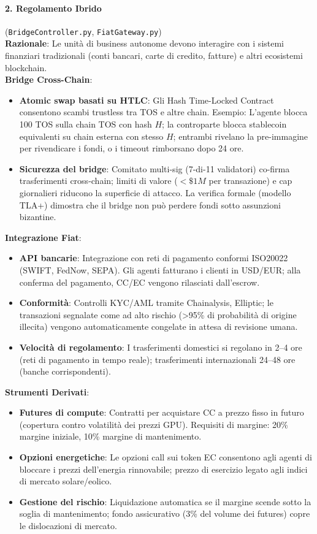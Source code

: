 \documentclass[11pt]{article}
\begin{document}
\paragraph{2. Regolamento Ibrido} (\texttt{BridgeController.py}, \texttt{FiatGateway.py})\\
\textbf{Razionale}: Le unità di business autonome devono interagire con i sistemi finanziari tradizionali (conti bancari, carte di credito, fatture) e altri ecosistemi blockchain.\\
\textbf{Bridge Cross-Chain}:
\begin{itemize}[noitemsep]
  \item \textbf{Atomic swap basati su HTLC}: Gli Hash Time-Locked Contract consentono scambi trustless tra TOS e altre chain. Esempio: L'agente blocca 100 TOS sulla chain TOS con hash $H$; la controparte blocca stablecoin equivalenti su chain esterna con stesso $H$; entrambi rivelano la pre-immagine per rivendicare i fondi, o i timeout rimborsano dopo 24 ore.
  \item \textbf{Sicurezza del bridge}: Comitato multi-sig (7-di-11 validatori) co-firma trasferimenti cross-chain; limiti di valore ($<\$1M$ per transazione) e cap giornalieri riducono la superficie di attacco. La verifica formale (modello TLA+) dimostra che il bridge non può perdere fondi sotto assunzioni bizantine.
\end{itemize}
\textbf{Integrazione Fiat}:
\begin{itemize}[noitemsep]
  \item \textbf{API bancarie}: Integrazione con reti di pagamento conformi ISO20022 (SWIFT, FedNow, SEPA). Gli agenti fatturano i clienti in USD/EUR; alla conferma del pagamento, CC/EC vengono rilasciati dall'escrow.
  \item \textbf{Conformità}: Controlli KYC/AML tramite Chainalysis, Elliptic; le transazioni segnalate come ad alto rischio (>95\% di probabilità di origine illecita) vengono automaticamente congelate in attesa di revisione umana.
  \item \textbf{Velocità di regolamento}: I trasferimenti domestici si regolano in 2--4 ore (reti di pagamento in tempo reale); trasferimenti internazionali 24--48 ore (banche corrispondenti).
\end{itemize}
\textbf{Strumenti Derivati}:
\begin{itemize}[noitemsep]
  \item \textbf{Futures di compute}: Contratti per acquistare CC a prezzo fisso in futuro (copertura contro volatilità dei prezzi GPU). Requisiti di margine: 20\% margine iniziale, 10\% margine di mantenimento.
  \item \textbf{Opzioni energetiche}: Le opzioni call sui token EC consentono agli agenti di bloccare i prezzi dell'energia rinnovabile; prezzo di esercizio legato agli indici di mercato solare/eolico.
  \item \textbf{Gestione del rischio}: Liquidazione automatica se il margine scende sotto la soglia di mantenimento; fondo assicurativo (3\% del volume dei futures) copre le dislocazioni di mercato.
\end{itemize}
\end{document}
